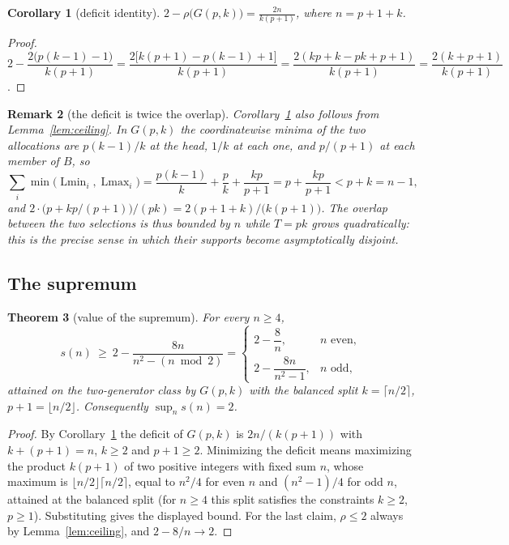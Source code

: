 \documentclass[11pt]{article}
\newtheorem{theorem}{Theorem}
\newtheorem{corollary}[theorem]{Corollary}
\newtheorem{remark}[theorem]{Remark}
\newcommand{\Lmin}{\operatorname{Lmin}}
\newcommand{\Lmax}{\operatorname{Lmax}}
\begin{document}
\begin{corollary}[deficit identity]\label{cor:deficit}
$\displaystyle 2-\rho\bigl(G(p,k)\bigr)=\frac{2n}{k(p+1)}$, where $n=p+1+k$.
\end{corollary}

\begin{proof}
$2-\dfrac{2\bigl(p(k-1)-1\bigr)}{k(p+1)}
 =\dfrac{2\bigl[k(p+1)-p(k-1)+1\bigr]}{k(p+1)}
 =\dfrac{2(kp+k-pk+p+1)}{k(p+1)}=\dfrac{2(k+p+1)}{k(p+1)}$.
\end{proof}

\begin{remark}[the deficit is twice the overlap]\label{rem:overlap}
Corollary~\ref{cor:deficit} also follows from Lemma~\ref{lem:ceiling}.  In
$G(p,k)$ the coordinatewise minima of the two allocations are $p(k-1)/k$ at
the head, $1/k$ at each one, and $p/(p+1)$ at each member of $B$, so
\[
 \sum_i\min\bigl(\Lmin_i,\Lmax_i\bigr)
 =\frac{p(k-1)}{k}+\frac pk+\frac{kp}{p+1}=p+\frac{kp}{p+1}<p+k=n-1,
\]
and $2\cdot\bigl(p+kp/(p+1)\bigr)/(pk)=2(p+1+k)/\bigl(k(p+1)\bigr)$.  The
overlap between the two selections is thus bounded by $n$ while $T=pk$ grows
quadratically: this is the precise sense in which their supports become
asymptotically disjoint.
\end{remark}

\subsection{The supremum}

\begin{theorem}[value of the supremum]\label{thm:sup}
For every $n\ge4$,
\[
 s(n)\ \ge\ 2-\frac{8n}{n^2-(n\bmod2)}
 =\begin{cases}
   2-\dfrac8n,& n\text{ even},\\[6pt]
   2-\dfrac{8n}{n^2-1},& n\text{ odd},
  \end{cases}
\]
attained on the two-generator class by $G(p,k)$ with the balanced split
$k=\lceil n/2\rceil$, $p+1=\lfloor n/2\rfloor$.  Consequently
$\sup_n s(n)=2$.
\end{theorem}

\begin{proof}
By Corollary~\ref{cor:deficit} the deficit of $G(p,k)$ is $2n/(k(p+1))$ with
$k+(p+1)=n$, $k\ge2$ and $p+1\ge2$.  Minimizing the deficit means maximizing
the product $k(p+1)$ of two positive integers with fixed sum $n$, whose
maximum is $\lfloor n/2\rfloor\lceil n/2\rceil$, equal to $n^2/4$ for even
$n$ and $(n^2-1)/4$ for odd $n$, attained at the balanced split (for $n\ge4$
this split satisfies the constraints $k\ge2$, $p\ge1$).  Substituting gives
the displayed bound.  For the last claim, $\rho\le2$ always by
Lemma~\ref{lem:ceiling}, and $2-8/n\to2$.
\end{proof}
\end{document}
